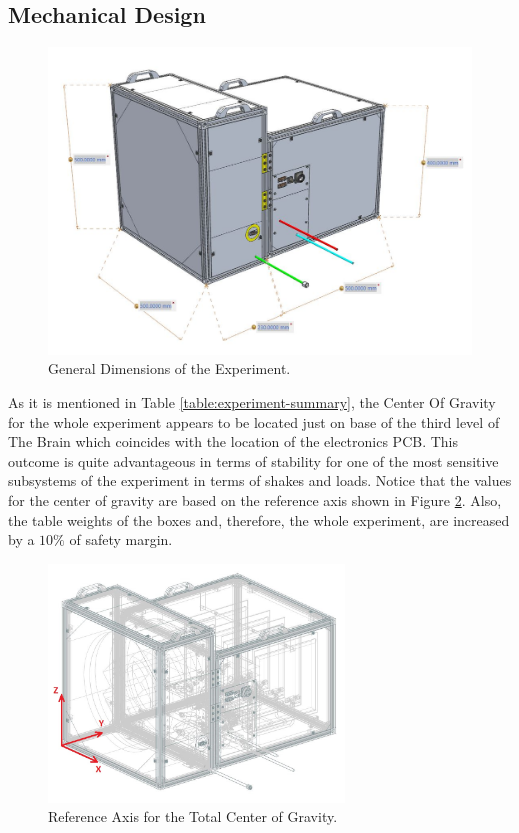 \pagebreak
\subsection{Mechanical Design} \label{Mechanical_Design}

 \begin{figure}[H]
     \centering
     \includegraphics[width=1\textwidth]{4-experiment-design/img/Mechanical/tubular_dimensions.jpg}
     \caption{General Dimensions of the Experiment.}
     \label{dimensions}
\end{figure}



As it is mentioned in Table \ref{table:experiment-summary}, the Center Of Gravity for the whole experiment appears to be located just on base of the third level of The Brain which coincides with the location of the electronics PCB. This outcome is quite advantageous in terms of stability for one of the most sensitive subsystems of the experiment in terms of shakes and loads. Notice that the values for the center of gravity are based on the reference axis shown in Figure \ref{COG}. Also, the table weights of the boxes and, therefore, the whole experiment, are increased by a $10\%$ of safety margin.

 \begin{figure}[H]
     \centering
     \includegraphics[width=0.7\textwidth]{4-experiment-design/img/Mechanical/COG.jpg}
     \caption{Reference Axis for the Total Center of Gravity.}
     \label{COG}
\end{figure}

